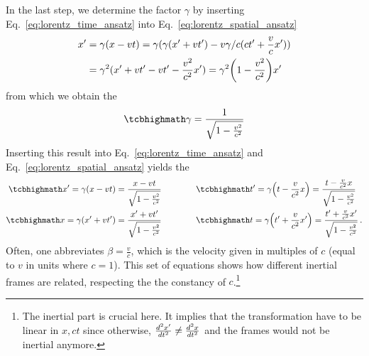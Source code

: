 \documentclass[../relativity_main.tex]{subfiles}
\begin{document}
In the last step, we determine the factor $\gamma$ by inserting Eq.~\eqref{eq:lorentz_time_ansatz} into Eq.~\eqref{eq:lorentz_spatial_ansatz}
\begin{align*}
	x' &= \gamma (x - vt) = \gamma (\gamma (x' + vt') - v \gamma / c (ct' + \frac{v}{c} x'))
	\\
	&= \gamma^2 (x' + vt' - vt' - \frac{v^2}{c^2} x') = \gamma^2 \qty(1 - \frac{v^2}{c^2}) x'
\end{align*}
from which we obtain the 
\begin{equation}\label{eq:gamma_factor}
	\eqbox{
	\gamma = \frac{1}{\sqrt{1 - \frac{v^2}{c^2}}}
	}
\end{equation}
Inserting this result into Eq.~\eqref{eq:lorentz_time_ansatz} and Eq.~\eqref{eq:lorentz_spatial_ansatz} yields the 
\begin{subequations}\label{eq:lorentz_trafo}
%
%
\begin{align}
	\eqbox{
	x' = \gamma \qty(x - vt) = \frac{x - vt}{\sqrt{1 - \frac{v^2}{c^2}}}
	}
	\qquad & \qquad
	\eqbox{
	t' = \gamma \qty(t - \frac{v}{c^2} x) = \frac{t - \frac{v}{c^2} x}{\sqrt{1 - \frac{v^2}{c^2}}}
	}
	\\
	\eqbox{
	x = \gamma \qty(x' + vt') = \frac{x' + vt'}{\sqrt{1 - \frac{v^2}{c^2}}}
	}
	\qquad & \qquad
	\eqbox{
	t = \gamma \qty(t' + \frac{v}{c^2} x') = \frac{t' + \frac{v}{c^2} x'}{\sqrt{1 - \frac{v^2}{c^2}}}
	} \, .
\end{align}
\end{subequations}
Often, one abbreviates $\beta = \frac{v}{c}$, which is the velocity given in multiples of $c$ (equal to $v$ in units where $c = 1$). This set of equations shows how different inertial frames are related, respecting the the constancy of $c$.\footnote{The inertial part is crucial here. It implies that the transformation have to be linear in $x, ct$ since otherwise, $\dv[2]{x'}{t} \neq \dv[2]{x}{t}$ and the frames would not be inertial anymore.}\\
\end{document}
